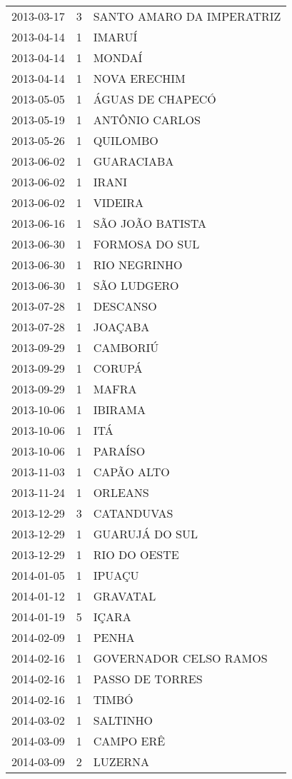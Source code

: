 \documentclass[
	12pt,				%
	openright,			%
	oneside,			%
	a4paper,			%
	english,			%
	french,				%
	spanish,			%
	brazil				%
	dvipsnames, table]{abntex2}
\begin{document}
\begin{longtable}[htbp]{ccl}
2013-03-17 & 3 & SANTO AMARO DA IMPERATRIZ \\
2013-04-14 & 1 & IMARUÍ \\
2013-04-14 & 1 & MONDAÍ \\
2013-04-14 & 1 & NOVA ERECHIM \\
2013-05-05 & 1 & ÁGUAS DE CHAPECÓ \\
2013-05-19 & 1 & ANTÔNIO CARLOS \\
2013-05-26 & 1 & QUILOMBO \\
2013-06-02 & 1 & GUARACIABA \\
2013-06-02 & 1 & IRANI \\
2013-06-02 & 1 & VIDEIRA \\
2013-06-16 & 1 & SÃO JOÃO BATISTA \\
2013-06-30 & 1 & FORMOSA DO SUL \\
2013-06-30 & 1 & RIO NEGRINHO \\
2013-06-30 & 1 & SÃO LUDGERO \\
2013-07-28 & 1 & DESCANSO \\
2013-07-28 & 1 & JOAÇABA \\
2013-09-29 & 1 & CAMBORIÚ \\
2013-09-29 & 1 & CORUPÁ \\
2013-09-29 & 1 & MAFRA \\
2013-10-06 & 1 & IBIRAMA \\
2013-10-06 & 1 & ITÁ \\
2013-10-06 & 1 & PARAÍSO \\
2013-11-03 & 1 & CAPÃO ALTO \\
2013-11-24 & 1 & ORLEANS \\
2013-12-29 & 3 & CATANDUVAS \\
2013-12-29 & 1 & GUARUJÁ DO SUL \\
2013-12-29 & 1 & RIO DO OESTE \\
2014-01-05 & 1 & IPUAÇU \\
2014-01-12 & 1 & GRAVATAL \\
2014-01-19 & 5 & IÇARA \\
2014-02-09 & 1 & PENHA \\
2014-02-16 & 1 & GOVERNADOR CELSO RAMOS \\
2014-02-16 & 1 & PASSO DE TORRES \\
2014-02-16 & 1 & TIMBÓ \\
2014-03-02 & 1 & SALTINHO \\
2014-03-09 & 1 & CAMPO ERÊ \\
2014-03-09 & 2 & LUZERNA \\

\end{longtable}
\end{document}
